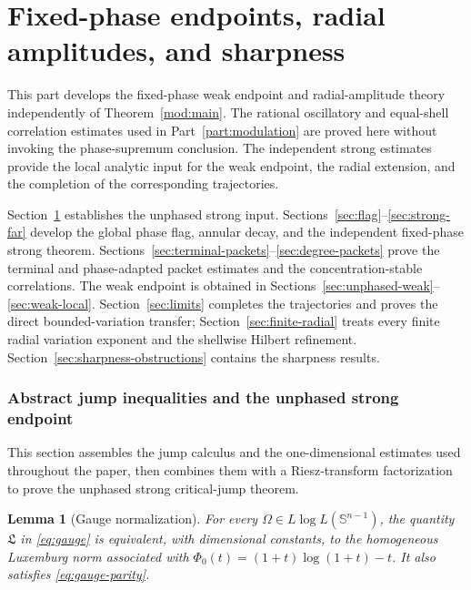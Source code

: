 \documentclass[11pt]{article}
\numberwithin{equation}{section}
\newtheorem{lemma}[theorem]{Lemma}
\theoremstyle{remark}
\theoremstyle{definition}
\newcommand{\Sph}{\mathbb S}
\begin{document}
\clearpage
\part{Fixed-phase endpoints, radial amplitudes, and sharpness}\label{part:fixed}
This part develops the fixed-phase weak endpoint and radial-amplitude
theory independently of Theorem~\ref{mod:main}. The rational oscillatory
and equal-shell correlation estimates used in Part~\ref{part:modulation}
are proved here without invoking the phase-supremum conclusion. The
independent strong estimates provide the local analytic input for the
weak endpoint, the radial extension, and the completion of the
corresponding trajectories.

Section~\ref{sec:nonosc-strong} establishes the unphased strong input.
Sections~\ref{sec:flag}--\ref{sec:strong-far} develop the global phase flag,
annular decay, and the independent fixed-phase strong theorem.
Sections~\ref{sec:terminal-packets}--\ref{sec:degree-packets} prove the
terminal and phase-adapted packet estimates and the concentration-stable
correlations. The weak endpoint is obtained in
Sections~\ref{sec:unphased-weak}--\ref{sec:weak-local}.
Section~\ref{sec:limits} completes the trajectories and proves the direct
bounded-variation transfer; Section~\ref{sec:finite-radial} treats every
finite radial variation exponent and the shellwise Hilbert refinement.
Section~\ref{sec:sharpness-obstructions} contains the sharpness results.

\section{Abstract jump inequalities and the unphased strong endpoint}
\label{sec:nonosc-strong}

This section assembles the jump calculus and the one-dimensional
estimates used throughout the paper, then combines them with a
Riesz-transform factorization to prove the unphased strong critical-jump
theorem.

\begin{lemma}[Gauge normalization]\label{lem:gauge-normalization}
For every $\Omega\in L\log L(\Sph^{n-1})$, the quantity $\mathfrak L$
in \eqref{eq:gauge} is equivalent, with
dimensional constants, to the homogeneous Luxemburg norm associated with
$\Phi_0(t)=(1+t)\log(1+t)-t$.  It also satisfies
\eqref{eq:gauge-parity}.
\end{lemma}
\end{document}
